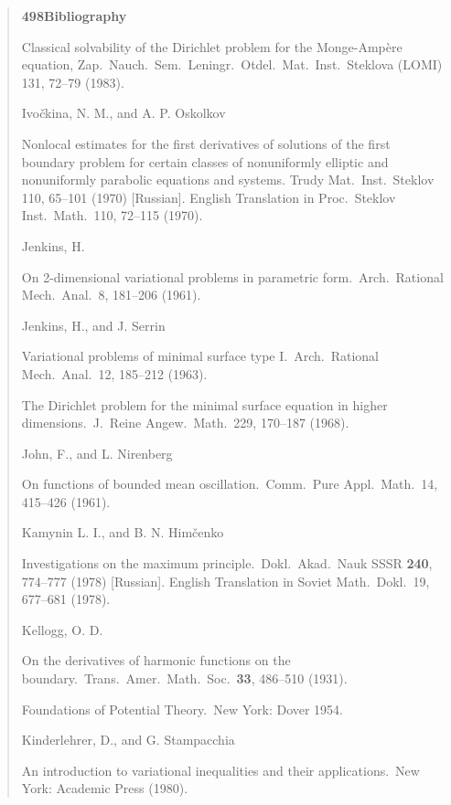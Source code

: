 \begin{quote}
\textbf{498}\hfill \textbf{Bibliography}

\noindent [IC 3]\quad Classical solvability of the Dirichlet problem for the Monge-Amp\`ere equation, Zap.\ Nauch.\ Sem.\ Leningr.\ Otdel.\ Mat.\ Inst.\ Steklova (LOMI) 131, 72--79 (1983).

\noindent Ivo\v{c}kina, N. M., and A. P. Oskolkov

\noindent [IO]\quad Nonlocal estimates for the first derivatives of solutions of the first boundary problem for certain classes of nonuniformly elliptic and nonuniformly parabolic equations and systems.
Trudy Mat.\ Inst.\ Steklov 110, 65--101 (1970) [Russian]. English Translation in Proc.\ Steklov Inst.\ Math.\ 110, 72--115 (1970).

\noindent Jenkins, H.

\noindent [JE]\quad On 2-dimensional variational problems in parametric form.\ Arch.\ Rational Mech.\ Anal.\ 8, 181--206 (1961).

\noindent Jenkins, H., and J. Serrin

\noindent [JS 1]\quad Variational problems of minimal surface type I.\ Arch.\ Rational Mech.\ Anal.\ 12, 185--212 (1963).

\noindent [JS 2]\quad The Dirichlet problem for the minimal surface equation in higher dimensions.\ J.\ Reine Angew.\ Math.\ 229, 170--187 (1968).

\noindent John, F., and L. Nirenberg

\noindent [JN]\quad On functions of bounded mean oscillation.\ Comm.\ Pure Appl.\ Math.\ 14, 415--426 (1961).

\noindent Kamynin L. I., and B. N. Him\v{c}enko

\noindent [KH]\quad Investigations on the maximum principle.\ Dokl.\ Akad.\ Nauk SSSR \textbf{240}, 774--777 (1978) [Russian]. English Translation in Soviet Math.\ Dokl.\ 19, 677--681 (1978).

\noindent Kellogg, O. D.

\noindent [KE 1]\quad On the derivatives of harmonic functions on the boundary.\ Trans.\ Amer.\ Math.\ Soc.\ \textbf{33}, 486--510 (1931).

\noindent [KE 2]\quad Foundations of Potential Theory.\ New York: Dover 1954.

\noindent Kinderlehrer, D., and G. Stampacchia

\noindent [KST]\quad An introduction to variational inequalities and their applications.\ New York: Academic Press (1980).


\end{quote}
